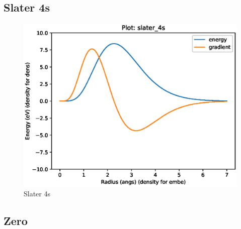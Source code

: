 
\FloatBarrier
\subsection{Slater 4s}





\FloatBarrier
\begin{figure}[h]
  \begin{center}
    \includegraphics[width=0.7\linewidth]{appendix/functions/pots_plots/slater_4s.eps}
    \caption{Slater 4s}
    \label{figure:functionsslater4s}
  \end{center}
\end{figure}




\subsection{Zero}





